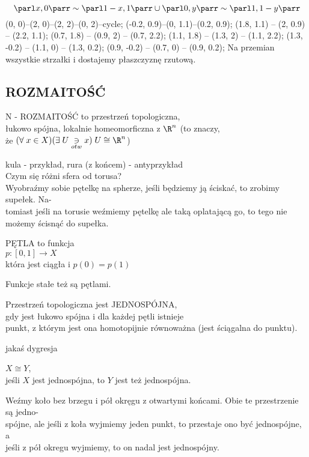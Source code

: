 \smallskip\\
$$\parl x, 0\parr\sim\parl 1-x, 1\parr\cup\parl 0, y\parr\sim\parl 1, 1-y\parr$$
\pmazidlo
     (0, 0)--(2, 0)--(2, 2)--(0, 2)--cycle;
     (-0.2, 0.9)--(0, 1.1)--(0.2, 0.9);
     (1.8, 1.1) -- (2, 0.9) -- (2.2, 1.1);
     (0.7, 1.8) -- (0.9, 2) -- (0.7, 2.2);
     (1.1, 1.8) -- (1.3, 2) -- (1.1, 2.2);
     (1.3, -0.2) -- (1.1, 0) -- (1.3, 0.2);
     (0.9, -0.2) -- (0.7, 0) -- (0.9, 0.2);
\kmazidlo
Na przemian wszystkie strzałki i dostajemy {\color{acc}płaszczyznę rzutową}.

\subsection{ROZMAITOŚĆ}
\begin{center}\large
    {\color{def}N - ROZMAITOŚĆ} to przestrzeń topologiczna, \\łukowo spójna, lokalnie homeomorficzna z $\R^n$ (to znaczy, \\że $(\forall\;x\in X)(\exists\;U\underset{otw}{\ni} x)\;U\cong \R^n$)
\end{center}
kula - przykład, rura (z końcem) - antyprzykład\bigskip\\
{\color{acc}Czym się różni sfera od torusa?} \medskip\\
Wyobraźmy sobie pętelkę na spherze, jeśli będziemy ją ściskać, to zrobimy supełek. Na-\\tomiast jeśli na torusie weźmiemy pętelkę ale taką oplatającą go, to tego nie \\możemy ścisnąć do supełka.\bigskip
\begin{center}\large
    {\color{def}PĘTLA} to funkcja\smallskip\\
    $p:[0,1]\to X$\smallskip\\
    która jest ciągła i $p(0)=p(1)$
\end{center}\bigskip
Funkcje stałe też są pętlami.\bigskip
\begin{center}\large
    Przestrzeń topologiczna jest {\color{def}JEDNOSPÓJNA}, \\gdy jest łukowo spójna i dla każdej pętli istnieje \\punkt, z którym jest ona homotopijnie równoważna ({\color{emp}jest ściągalna do punktu}).
\end{center}
jakaś dygresja\bigskip
\begin{center}\large
    $X\cong Y$,\\
    jeśli $X$ jest jednospójna, to $Y$ jest też jednospójna.
\end{center}
Weźmy koło bez brzegu i pół okręgu z otwartymi końcami. Obie te przestrzenie są jedno-\\spójne, ale jeśli z koła wyjmiemy jeden punkt, to przestaje ono być jednospójne, a \\jeśli z pół okregu wyjmiemy, to on nadal jest jednospójny.

